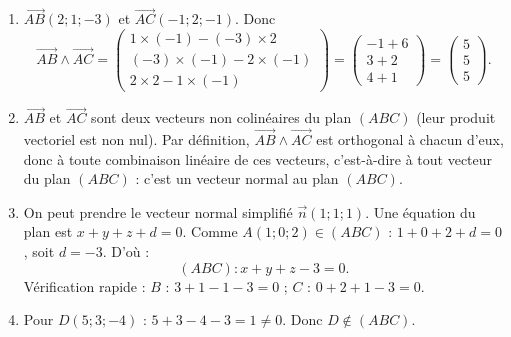 \documentclass[11pt]{article}
\begin{document}
\begin{corrige}
\begin{enumerate}
\item $\overrightarrow{AB}(2 ; 1 ; -3)$ et $\overrightarrow{AC}(-1 ; 2 ; -1)$. Donc
\[ \overrightarrow{AB} \wedge \overrightarrow{AC} = \begin{pmatrix} 1\times(-1) - (-3)\times 2 \\ (-3)\times(-1) - 2\times(-1) \\ 2\times 2 - 1\times(-1) \end{pmatrix} = \begin{pmatrix} -1+6 \\ 3+2 \\ 4+1 \end{pmatrix} = \begin{pmatrix} 5 \\ 5 \\ 5 \end{pmatrix}. \]
\item $\overrightarrow{AB}$ et $\overrightarrow{AC}$ sont deux vecteurs non colinéaires du plan $(ABC)$ (leur produit vectoriel est non nul). Par définition, $\overrightarrow{AB} \wedge \overrightarrow{AC}$ est orthogonal à chacun d'eux, donc à toute combinaison linéaire de ces vecteurs, c'est-à-dire à tout vecteur du plan $(ABC)$ : c'est un vecteur normal au plan $(ABC)$.
\item On peut prendre le vecteur normal simplifié $\vec{n}(1 ; 1 ; 1)$. Une équation du plan est $x + y + z + d = 0$. Comme $A(1 ; 0 ; 2) \in (ABC)$ : $1 + 0 + 2 + d = 0$, soit $d = -3$. D'où :
\[ (ABC) : x + y + z - 3 = 0. \]
Vérification rapide : $B$ : $3+1-1-3 = 0$ ; $C$ : $0+2+1-3 = 0$.
\item Pour $D(5 ; 3 ; -4)$ : $5 + 3 - 4 - 3 = 1 \neq 0$. Donc $D \notin (ABC)$.
\end{enumerate}
\end{corrige}
\end{document}
